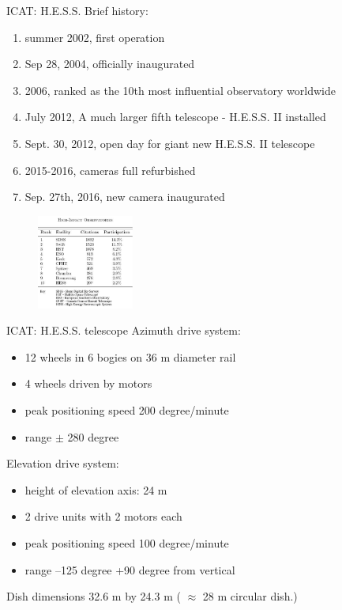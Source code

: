 \documentclass{beamer}
\begin{document}
\begin{frame}{ICAT: H.E.S.S.}
	Brief history:
	\begin{enumerate}
		\item summer 2002, first operation
		\item Sep 28, 2004, officially inaugurated
		\item 2006, ranked as the 10th most influential observatory worldwide
		\item July 2012, A much larger fifth telescope - H.E.S.S. II installed
		\item Sept. 30, 2012, open day for giant new H.E.S.S. II telescope
		\item 2015-2016, cameras full refurbished
		\item Sep. 27th, 2016, new camera inaugurated
	\end{enumerate}
	\begin{figure}[h]
		\includegraphics[width=120px]{telescopes-rank.jpg}
	\end{figure}
\end{frame}



\begin{frame}{ICAT: H.E.S.S. telescope}
	Azimuth drive system:
	\begin{itemize}
		\item 12 wheels in 6 bogies on 36 m diameter rail
		\item 4 wheels driven by motors
		\item peak positioning speed 200 degree/minute
		\item range $\pm$ 280 degree
	\end{itemize}
	\hfill \break
	Elevation drive system:
	\begin{itemize}
		\item height of elevation axis: 24 m
		\item 2 drive units with 2 motors each
		\item peak positioning speed 100 degree/minute
		\item range –125 degree +90 degree from vertical
	\end{itemize}
	\hfill \break
	Dish dimensions 32.6 m by 24.3 m ( $\approx$ 28 m circular dish.)
\end{frame}
\end{document}
